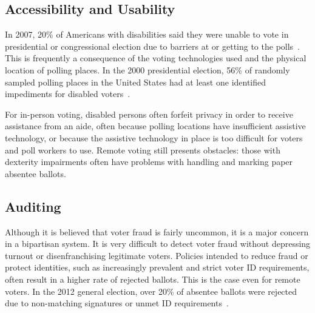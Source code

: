 

\subsection{Accessibility and Usability}

In 2007, 20\% of Americans with disabilities said they were unable to
vote in presidential or congressional election due to barriers at or
getting to the polls~\cite{runyan2007improving}. This is frequently a
consequence of the voting technologies used and the physical location
of polling places. In the 2000 presidential election, 56\% of randomly
sampled polling places in the United States had at least one
identified impediments for disabled voters~\cite{united2001voters}.

For in-person voting, disabled persons often forfeit privacy in order
to receive assistance from an aide, often because polling locations
have insufficient assistive technology, or because the assistive
technology in place is too difficult for voters and poll workers
to use. Remote voting still presents obstacles: those with dexterity
impairments often have problems with handling and marking paper
absentee ballots.

\subsection{Auditing}

Although it is believed that voter fraud is fairly uncommon, it is a
major concern in a bipartisan system. It is very difficult to detect
voter fraud without depressing turnout or disenfranchising legitimate
voters. Policies intended to reduce fraud or protect identities, such
as increasingly prevalent and strict voter ID requirements, often
result in a higher rate of rejected ballots. This is the case even for remote voters. In
the 2012 general election, over 20\% of absentee ballots were rejected
due to non-matching signatures or unmet ID
requirements~\cite{eac2012survey}.

